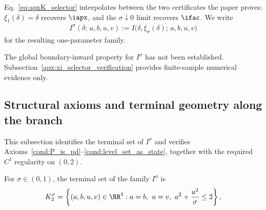 \documentclass{article}
\begin{document}
Eq.~\eqref{eq:apxK_selector} interpolates between the two certificates the
paper proves: $\xi_1(\delta)=\delta$ recovers $\iapx$, and the
$\sigma\downarrow0$ limit recovers $\ifac$. We write
\begin{align}
    I^\sigma(\delta;\,a,b,u,v)
    :=
    I\bigl(\delta,\xi_\sigma(\delta);\,a,b,u,v\bigr)
    \label{eq:apxK_selected_certificate}
\end{align}
for the resulting one-parameter family.

The global boundary-inward property for $I^\sigma$ has not been established.
Subsection~\ref{apx:xi_selector_verification} provides finite-sample numerical
evidence only.

\subsection{Structural axioms and terminal geometry along the branch}
\label{subsec:diag1sigma_terminal_reduction}

This subsection identifies the terminal set of $I^\sigma$ and verifies
Axioms~\ref{cond:P_is_pd}--\ref{cond:level_set_as_state}, together with the
required $C^1$ regularity on $(0,2)$.

\begin{proposition}\label{prop:diag1sigma_K2_reduction}
For $\sigma\in(0,1)$, the terminal set of the family $I^\sigma$ is
\begin{align}
    K_2^\sigma
    =
    \left\{
        (a,b,u,v)\in\RR^4 :
        a=b,\ u=v,\ a^2+\frac{u^2}{\sigma}\le 2
    \right\},
    \label{eq:apxK_K2_sigma}
\end{align}
\end{proposition}
\end{document}
